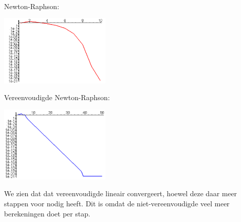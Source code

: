 \\
Newton-Raphson:\\
\begin{center}
\includegraphics[width=200px]{figure/nr.PNG} \\
\end{center}
Vereenvoudigde Newton-Raphson:\\
\begin{center}
\includegraphics[width=200px]{figure/ver_nr.PNG}
\end{center}
We zien dat dat vereenvoudigde lineair convergeert, hoewel deze daar meer stappen voor nodig heeft. Dit is omdat de niet-vereenvoudigde veel meer berekeningen doet per stap.